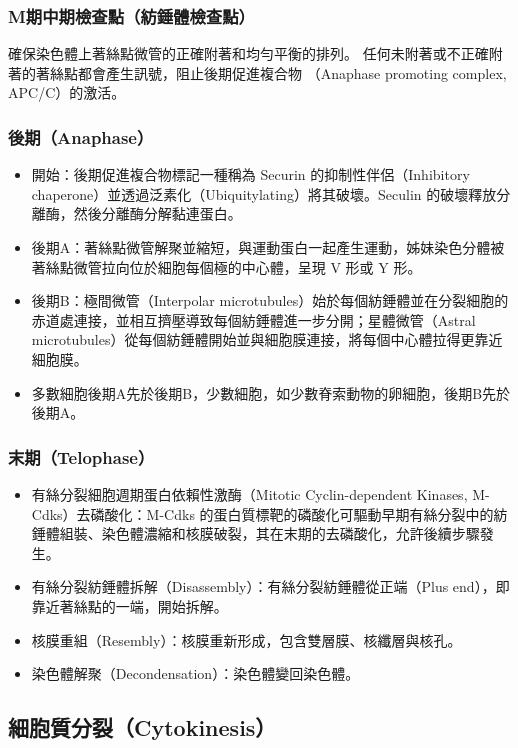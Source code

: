 \documentclass[a4paper,12pt]{report}
\begin{document}
\subsubsection{M期中期檢查點（紡錘體檢查點）}
確保染色體上著絲點微管的正確附著和均勻平衡的排列。 任何未附著或不正確附著的著絲點都會產生訊號，阻止後期促進複合物 （Anaphase promoting complex, APC/C）的激活。
\subsubsection{後期（Anaphase）}
\begin{itemize}
  \item 開始：後期促進複合物標記一種稱為 Securin 的抑制性伴侶（Inhibitory chaperone）並透過泛素化（Ubiquitylating）將其破壞。Seculin 的破壞釋放分離酶，然後分離酶分解黏連蛋白。
  \item 後期A：著絲點微管解聚並縮短，與運動蛋白一起產生運動，姊妹染色分體被著絲點微管拉向位於細胞每個極的中心體，呈現 V 形或 Y 形。
  \item 後期B：極間微管（Interpolar microtubules）始於每個紡錘體並在分裂細胞的赤道處連接，並相互擠壓導致每個紡錘體進一步分開；星體微管（Astral microtubules）從每個紡錘體開始並與細胞膜連接，將每個中心體拉得更靠近細胞膜。
  \item 多數細胞後期A先於後期B，少數細胞，如少數脊索動物的卵細胞，後期B先於後期A。
\end{itemize}
\subsubsection{末期（Telophase）}
\begin{itemize}
  \item 有絲分裂細胞週期蛋白依賴性激酶（Mitotic Cyclin-dependent Kinases, M-Cdks）去磷酸化：M-Cdks 的蛋白質標靶的磷酸化可驅動早期有絲分裂中的紡錘體組裝、染色體濃縮和核膜破裂，其在末期的去磷酸化，允許後續步驟發生。
  \item 有絲分裂紡錘體拆解（Disassembly）：有絲分裂紡錘體從正端（Plus end），即靠近著絲點的一端，開始拆解。
  \item 核膜重組（Resembly）：核膜重新形成，包含雙層膜、核纖層與核孔。
  \item 染色體解聚（Decondensation）：染色體變回染色體。
\end{itemize}
\subsection{細胞質分裂（Cytokinesis）}
\end{document}
